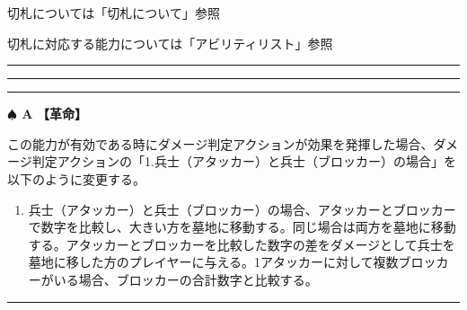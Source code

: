 \documentclass[twocolumn,a5paper,papersize,10pt]{jarticle}
\begin{document}
切札については「切札について」参照

切札に対応する能力については「アビリティリスト」参照

\begin{center}
\begin{center}
\hrule height 1mm depth 0mm width 66.5mm %
\vspace{1mm}%
{\Large\bf {}}
\vspace{1mm}%
\hrule height 0.5mm depth 0mm width 66.5mm %
\end{center}
\end{center}
\vspace{-2zh}%



\vspace{3mm} %
\hrule height 0.5mm depth 0mm width 66.5mm %
\vspace{1mm} %
{\Large\bf $\spadesuit$ A} {\normalsize\bf【革命】} %
\vspace{1mm} %

この能力が有効である時にダメージ判定アクションが効果を発揮した場合、ダメージ判定アクションの「1.兵士（アタッカー）と兵士（ブロッカー）の場合」を以下のように変更する。


\vspace{-1zh}%
\begin{enumerate}
\setlength{\leftskip}{-0.3cm}
\setlength{\parskip}{0pt} %

\item 兵士（アタッカー）と兵士（ブロッカー）の場合、アタッカーとブロッカーで数字を比較し、大きい方を墓地に移動する。同じ場合は両方を墓地に移動する。アタッカーとブロッカーを比較した数字の差をダメージとして兵士を墓地に移した方のプレイヤーに与える。1アタッカーに対して複数ブロッカーがいる場合、ブロッカーの合計数字と比較する。
\vspace{-1zh}%
\end{enumerate}

\vspace{1mm}%

\hrule height 0.1mm depth 0mm width 66.5mm %
\end{document}
